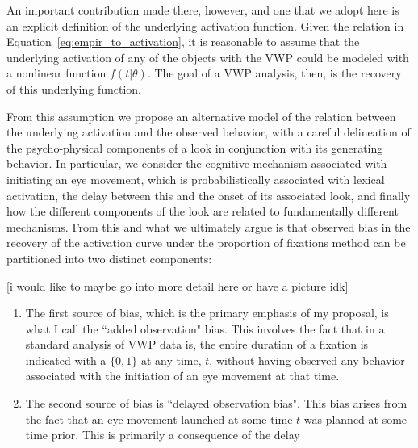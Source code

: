 An important contribution made there, however, and one that we adopt here is an explicit definition of the underlying activation function. Given the relation in Equation~\ref{eq:empir_to_activation}, it is reasonable to assume that the underlying activation of any of the objects with the VWP could be modeled with a nonlinear function $f(t|\theta)$. The goal of a VWP analysis, then, is the recovery of this underlying function.

From this assumption we propose an alternative model of the relation between the underlying activation and the observed behavior, with a careful delineation of the psycho-physical components of a look in conjunction with its generating behavior. In particular, we consider the cognitive mechanism associated with initiating an eye movement, which is probabilistically associated with lexical activation, the delay between this and the onset of its associated look, and finally how the different components of the look are related to fundamentally different mechanisms. From this and what we ultimately argue is that observed bias in the recovery of the activation curve under the proportion of fixations method can be partitioned into two distinct components:

[i would like to maybe go into more detail here or have a picture idk]

\begin{enumerate}
\vspace{-3mm}
\item The first source of bias, which is the primary emphasis of my proposal, is what I call the ``added observation" bias. This involves the fact that in  a standard analysis of VWP data is, the entire duration of a fixation is indicated with a $\{0,1\}$  at any time, $t$, without having observed any behavior associated with the initiation of an eye movement at that time.
\item The second source of bias is ``delayed observation bias". This bias arises from the fact that an eye movement launched at some time $t$ was planned at some time prior. This is primarily a consequence of the  delay
\end{enumerate}

